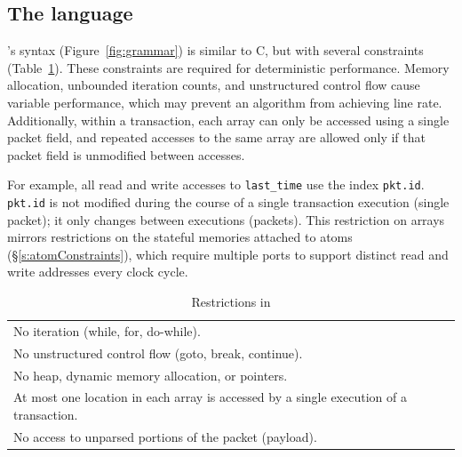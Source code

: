 \subsection{The \pktlanguage language}
\label{ss:constraints}
\pktlanguage's syntax (Figure~\ref{fig:grammar}) is similar to C, but with
several constraints (Table~\ref{tab:restrict}).  These constraints are required
for deterministic performance.  Memory allocation, unbounded iteration counts,
and unstructured control flow cause variable performance, which may prevent an
algorithm from achieving line rate. Additionally, within a \pktlanguage transaction, 
each array can only be accessed using a single packet field, and repeated accesses to the 
same array are allowed only if that packet field is unmodified between accesses.

For example, all read and write accesses to \texttt{last\_time} use the
index \texttt{pkt.id}. \texttt{pkt.id} is not modified during the
course of a single transaction execution (single packet); it only changes between executions
(packets).  This restriction on arrays mirrors restrictions on the stateful memories
attached to atoms (\S\ref{s:atomConstraints}), which require multiple ports to
support distinct read and write addresses every clock cycle.

\begin{table}
  \begin{tabular}{p{}}
   No iteration (while, for, do-while).\\
   No unstructured control flow (goto, break, continue).\\
   No heap, dynamic memory allocation, or pointers.\\
   At most one location in each array is accessed by a single execution of a transaction. \\
   No access to unparsed portions of the packet (payload).\\
  \end{tabular}
  \caption{Restrictions in \pktlanguage}
  \label{tab:restrict}
\end{table}

